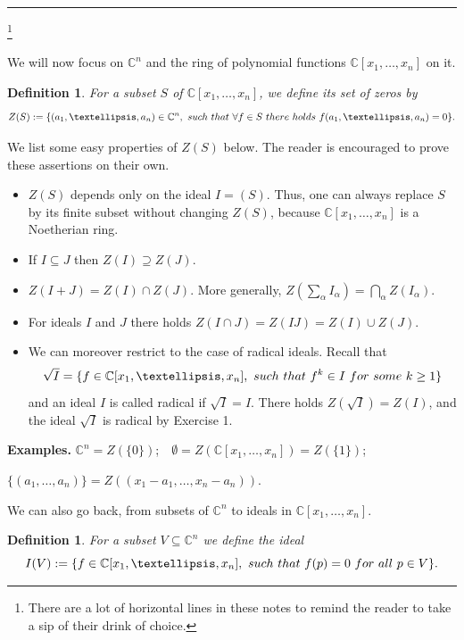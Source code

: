 \documentclass[11pt]{article}
\numberwithin{equation}{section}
\numberwithin{footnote}{section}
\newtheorem{defn}[thm]{Definition}
\newcommand{\blue}{\color{blue}}
\newcommand{\C}{{\mathbb C}}
\begin{document}
\smallskip
{\blue \hrule}\footnote{ There are a lot of horizontal lines in these notes to remind the reader to take a sip of their drink of choice.}

\smallskip\noindent
We will now focus on $\C^n$ and the ring of polynomial functions $\C[x_1,\ldots,x_n]$ on it. 

\begin{defn}
For a subset $S$ of $\C[x_1,\ldots,x_n]$, we define its {\blue set of zeros} by 
$$
Z(S):=\{(a_1,\ldots,a_n)\in \C^n,~{\rm such~that~}\forall f\in S {\rm~there~holds~}f(a_1,\ldots,a_n)=0\}.
$$
\end{defn}

\noindent
We list some easy properties of $Z(S)$ below. The reader is encouraged to prove these assertions on their own.
\begin{itemize}
\item $Z(S)$ depends only on the ideal $I=(S)$. Thus, one can always replace $S$ by its finite subset without changing $Z(S)$, because 
$\C[x_1,\ldots,x_n]$ is a Noetherian ring. 

\item If $I \subseteq J$ then $Z(I)\supseteq Z(J)$.

\item $Z(I+J) = Z(I)\cap Z(J)$. More generally, $Z(\sum_\alpha I_\alpha) = \bigcap_\alpha Z(I_\alpha)$.


\item For ideals $I$ and $J$ there holds $Z(I\cap J) = Z(IJ) = Z(I)\cup Z(J)$.

\item  
We can moreover restrict to the case of {\blue radical} ideals. Recall that 
$$
\sqrt I = \{f\in \C[x_1,\ldots,x_n],~{\rm such~that~} f^k \in I{\rm ~for ~some ~}k\geq 1\}
$$
and an ideal $I$ is called radical if $\sqrt I =I$. There holds $Z(\sqrt I) = Z(I)$, and the ideal $\sqrt I$ is radical by Exercise 1.

\end{itemize}

\smallskip\noindent
{\bf Examples.} $\C^n=Z(\{0\})$;~~$\emptyset = Z(\C[x_1,\ldots,x_n]) = Z(\{1\})$;~~

$\{(a_1,\ldots,a_n)\} = Z((x_1-a_1,\ldots,x_n-a_n))$.


\smallskip
\smallskip
We can also go back, from subsets of $\C^n$ to ideals in $\C[x_1,\ldots,x_n]$.

\smallskip
\begin{defn}
For a subset $V\subseteq \C^n$ we define the ideal 
$$
I(V) := \{f\in \C[x_1,\ldots,x_n],~{\rm such~that~}f(p)=0{\rm~for~all~}p\in V\}.
$$
\end{defn}
\end{document}
